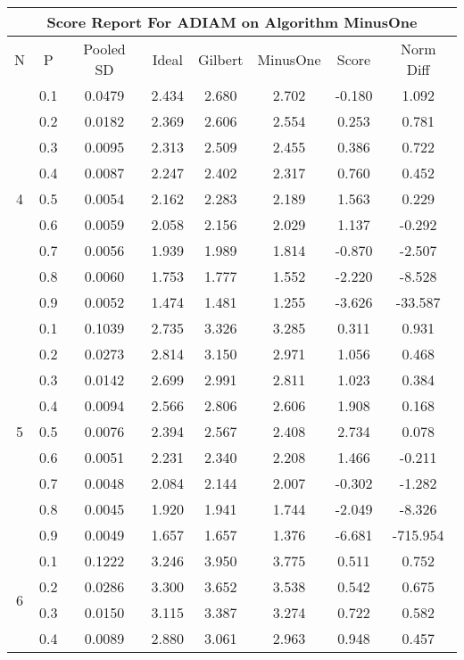 \documentclass[11pt,a4paper]{report}
\begin{document}
\begin{longtable}{ | c | c || c | c | c | c | c | c | }
\hline
\multicolumn{8}{|c|}{ Score Report For ADIAM on Algorithm MinusOne} \\
\hline
N & P & Pooled SD &  Ideal &  Gilbert & MinusOne  & Score & Norm Diff \\
 \hline
 \hline
 \endhead
\multirow{9}{*}{4} & 0.1 & 0.0479 & 2.434 & 2.680 & 2.702 & -0.180 & 1.092 \\
 & 0.2 & 0.0182 & 2.369 & 2.606 & 2.554 & 0.253 & 0.781 \\
 & 0.3 & 0.0095 & 2.313 & 2.509 & 2.455 & 0.386 & 0.722 \\
 & 0.4 & 0.0087 & 2.247 & 2.402 & 2.317 & 0.760 & 0.452 \\
 & 0.5 & 0.0054 & 2.162 & 2.283 & 2.189 & 1.563 & 0.229 \\
 & 0.6 & 0.0059 & 2.058 & 2.156 & 2.029 & 1.137 & -0.292 \\
 & 0.7 & 0.0056 & 1.939 & 1.989 & 1.814 & -0.870 & -2.507 \\
 & 0.8 & 0.0060 & 1.753 & 1.777 & 1.552 & -2.220 & -8.528 \\
 & 0.9 & 0.0052 & 1.474 & 1.481 & 1.255 & -3.626 & -33.587 \\
 \hline
\multirow{9}{*}{5} & 0.1 & 0.1039 & 2.735 & 3.326 & 3.285 & 0.311 & 0.931 \\
 & 0.2 & 0.0273 & 2.814 & 3.150 & 2.971 & 1.056 & 0.468 \\
 & 0.3 & 0.0142 & 2.699 & 2.991 & 2.811 & 1.023 & 0.384 \\
 & 0.4 & 0.0094 & 2.566 & 2.806 & 2.606 & 1.908 & 0.168 \\
 & 0.5 & 0.0076 & 2.394 & 2.567 & 2.408 & 2.734 & 0.078 \\
 & 0.6 & 0.0051 & 2.231 & 2.340 & 2.208 & 1.466 & -0.211 \\
 & 0.7 & 0.0048 & 2.084 & 2.144 & 2.007 & -0.302 & -1.282 \\
 & 0.8 & 0.0045 & 1.920 & 1.941 & 1.744 & -2.049 & -8.326 \\
 & 0.9 & 0.0049 & 1.657 & 1.657 & 1.376 & -6.681 & -715.954 \\
 \hline
\multirow{9}{*}{6} & 0.1 & 0.1222 & 3.246 & 3.950 & 3.775 & 0.511 & 0.752 \\
 & 0.2 & 0.0286 & 3.300 & 3.652 & 3.538 & 0.542 & 0.675 \\
 & 0.3 & 0.0150 & 3.115 & 3.387 & 3.274 & 0.722 & 0.582 \\
 & 0.4 & 0.0089 & 2.880 & 3.061 & 2.963 & 0.948 & 0.457 \\

\end{longtable}
\end{document}
